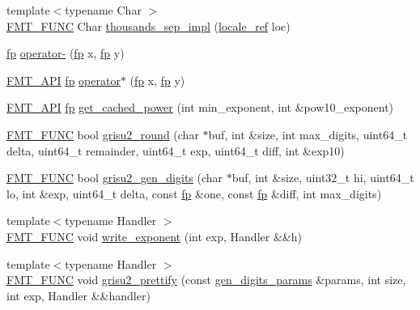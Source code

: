 \begin{DoxyCompactItemize}
\item 
{\footnotesize template$<$typename Char $>$ }\\\hyperlink{format_8h_a02c8898388e0ae59aab58be14fcd4e05}{F\+M\+T\+\_\+\+F\+U\+NC} Char \hyperlink{namespaceinternal_a70aa19597fbb8bad857a307b17c6b478}{thousands\+\_\+sep\+\_\+impl} (\hyperlink{classinternal_1_1locale__ref}{locale\+\_\+ref} loc)
\item 
\hyperlink{classinternal_1_1fp}{fp} \hyperlink{namespaceinternal_a7e865636bf5c10d44d1dfb4d9ec22c79}{operator-\/} (\hyperlink{classinternal_1_1fp}{fp} x, \hyperlink{classinternal_1_1fp}{fp} y)
\item 
\hyperlink{core_8h_a9a4960b70582ed2620911a0b75dce0b5}{F\+M\+T\+\_\+\+A\+PI} \hyperlink{classinternal_1_1fp}{fp} \hyperlink{namespaceinternal_a2142ade7c615c7cd113144896aed15c8}{operator$\ast$} (\hyperlink{classinternal_1_1fp}{fp} x, \hyperlink{classinternal_1_1fp}{fp} y)
\item 
\hyperlink{core_8h_a9a4960b70582ed2620911a0b75dce0b5}{F\+M\+T\+\_\+\+A\+PI} \hyperlink{classinternal_1_1fp}{fp} \hyperlink{namespaceinternal_aeafc6f6fcfd4e798c6bde994828330e6}{get\+\_\+cached\+\_\+power} (int min\+\_\+exponent, int \&pow10\+\_\+exponent)
\item 
\hyperlink{format_8h_a02c8898388e0ae59aab58be14fcd4e05}{F\+M\+T\+\_\+\+F\+U\+NC} bool \hyperlink{namespaceinternal_afc76db0ad587455f6942b74d175ee56a}{grisu2\+\_\+round} (char $\ast$buf, int \&size, int max\+\_\+digits, uint64\+\_\+t delta, uint64\+\_\+t remainder, uint64\+\_\+t exp, uint64\+\_\+t diff, int \&exp10)
\item 
\hyperlink{format_8h_a02c8898388e0ae59aab58be14fcd4e05}{F\+M\+T\+\_\+\+F\+U\+NC} bool \hyperlink{namespaceinternal_a654d8a0809bb6e5db2deacf15b2971a2}{grisu2\+\_\+gen\+\_\+digits} (char $\ast$buf, int \&size, uint32\+\_\+t hi, uint64\+\_\+t lo, int \&exp, uint64\+\_\+t delta, const \hyperlink{classinternal_1_1fp}{fp} \&one, const \hyperlink{classinternal_1_1fp}{fp} \&diff, int max\+\_\+digits)
\item 
{\footnotesize template$<$typename Handler $>$ }\\\hyperlink{format_8h_a02c8898388e0ae59aab58be14fcd4e05}{F\+M\+T\+\_\+\+F\+U\+NC} void \hyperlink{namespaceinternal_a580207e19bc8ef3c099ccc3154f1e8d6}{write\+\_\+exponent} (int exp, Handler \&\&h)
\item 
{\footnotesize template$<$typename Handler $>$ }\\\hyperlink{format_8h_a02c8898388e0ae59aab58be14fcd4e05}{F\+M\+T\+\_\+\+F\+U\+NC} void \hyperlink{namespaceinternal_a868ca3301073105fcbd25d79ff98ca16}{grisu2\+\_\+prettify} (const \hyperlink{structinternal_1_1gen__digits__params}{gen\+\_\+digits\+\_\+params} \&params, int size, int exp, Handler \&\&handler)

\end{DoxyCompactItemize}
